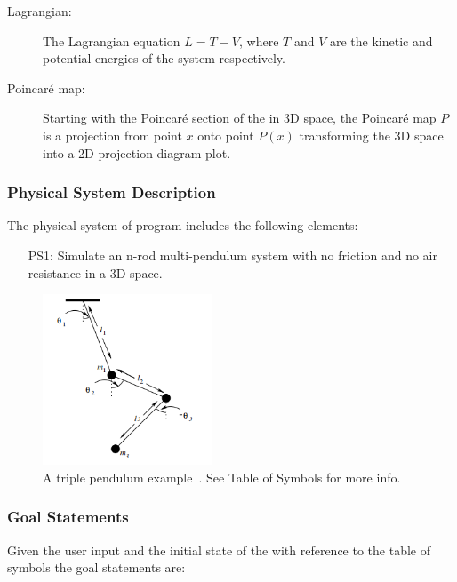 \documentclass[12pt]{article}
\begin{document}
\begin{description}
\item[Lagrangian:] The Lagrangian equation $L=T-V$, where $T$ and $V$ are 
the kinetic and potential energies of the system respectively.
\item[Poincaré map:] Starting with the Poincaré section of the \progname 
in 3D space, the Poincaré map $P$ is a projection from point $x$ onto point 
$P(x)$ transforming the 3D space into a 2D projection diagram plot.
\end{description}

\subsubsection{Physical System Description}

The physical system of \progname program includes the following elements:

\begin{itemize}
\item[PS1:] Simulate an n-rod multi-pendulum system with no friction and no air
resistance in a 3D space.
\end{itemize}

\begin{figure}[H]
	\centering
	\includegraphics[width=190px]{triplependula.PNG}
\caption{A triple pendulum example~\citep{SzuminskiOlsztyn2012}.
See Table of Symbols for more info.}
	\label{fig:maxresdefault}
\end{figure}

\subsubsection{Goal Statements}

\noindent Given the user input and the initial state of the \progname with 
reference to the table of symbols the goal statements are: 

\end{document}

